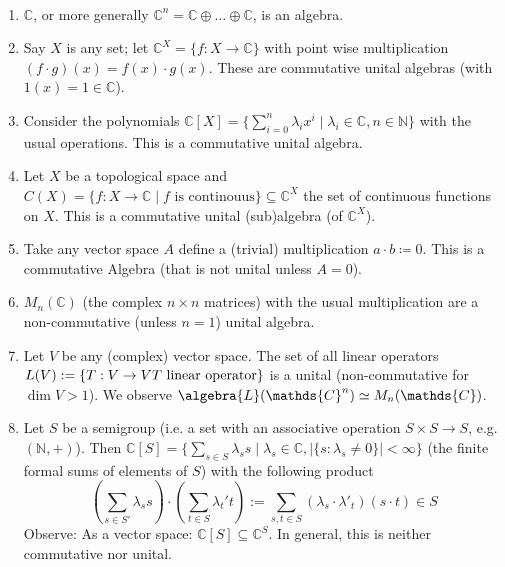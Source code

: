 \documentclass[a4paper]{article}
\begin{document}
\begin{example}~
	\begin{enumerate}
		\item $\mathds{C}$, or more generally $\mathds{C}^n = \mathds{C} \oplus \dots \oplus \mathds{C}$, is an algebra.
		\item Say $X$ is any set; let $\mathds{C}^X = \{ f: X \to \mathds{C} \}$ with point wise multiplication $(f \cdot g)(x) = f(x) \cdot g(x)$.
		      These are commutative unital algebras (with $1(x) = 1 \in \mathds{C}$).
		\item Consider the polynomials $\mathds{C}[X] = \{ \sum_{i = 0}^{n} \lambda_i x^i \mid \lambda_i \in \mathds{C}, n \in \mathds{N} \}$ with the usual operations.
		      This is a commutative unital algebra.
		\item Let $X$ be a topological space and $C(X) = \{f: X \to \mathds{C} \mid f \text{ is continouus}\} \subseteq \mathds{C}^X$ the set of continuous functions on $X$.
		      This is a commutative unital (sub)algebra (of $\mathds{C}^X$).
		\item Take any vector space $A$ define a (trivial) multiplication $a \cdot b \coloneqq 0$.
		      This is a commutative Algebra (that is not unital unless $A = 0$).
		\item $M_n(\mathds{C})$ (the complex $n \times n$ matrices) with the usual multiplication are a non-commutative (unless $n=1$) unital algebra.
		\item Let $V$ be any (complex) vector space. The set of all linear operators $L(V) := \{T: V \to V \mit T \text{ linear operator}\}$ is a unital (non-commutative for $\dim V > 1$). We observe $\algebra{L}(\mathds{C}^n) \simeq M_n(\mathds{C})$.
		\item Let $S$ be a semigroup (i.e. a set with an associative operation $S \times S \to S$, e.g. $(\mathds{N}, +)$). Then $\mathds{C}[S] = \{ \sum_{s \in S} \lambda_s s \mid \lambda_s \in \mathds{C}, |\{s: \lambda_s \neq 0\}| < \infty \}$ (the finite formal sums of elements of $S$) with the following product
		      \begin{equation*}
			      \left(\sum_{s \in S'}\lambda_s s\right) \cdot \left(\sum_{t \in S} \lambda_t' t\right) := \sum_{s,t \in S} (\lambda_s \cdot \lambda'_t)(s \cdot t) \in S
		      \end{equation*}
		      Observe: As a vector space: $\mathds{C}[S] \subseteq \mathds{C}^S$.
		      In general, this is neither commutative nor unital.
	\end{enumerate}
\end{example}
\end{document}
